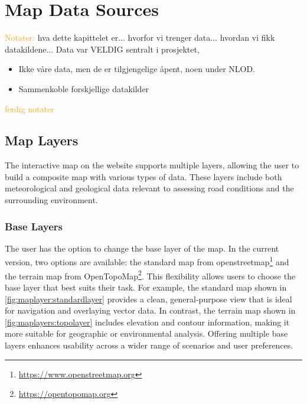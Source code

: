 \chapter{Map Data Sources}\label{chap:mapdatasources}

\textcolor{orange}{Notater:}
hva dette kapittelet er... hvorfor vi trenger data... hvordan vi fikk datakildene... 
Data var VELDIG sentralt i prosjektet, 
\begin{itemize}
    \item Ikke våre data, men de er tilgjengelige åpent, noen under NLOD.
    \item Sammenkoble forskjellige datakilder
\end{itemize}
\textcolor{orange}{ferdig notater}

\section{Map Layers}\label{sec:maplayers}

The interactive map on the website supports multiple layers, allowing the user to build a composite map with various types of data. These layers include both meteorological and geological data relevant to assessing road conditions and the surrounding environment.

\subsection{Base Layers}\label{subsec:baselayers}

The user has the option to change the base layer of the map. In the current version, two options are available: the standard map from \gls{openstreetmap}\footnote{\url{https://www.openstreetmap.org}} and the terrain map from OpenTopoMap\footnote{\url{https://opentopomap.org}}. This flexibility allows users to choose the base layer that best suits their task. For example, the standard map shown in \autoref{fig:maplayer:standardlayer} provides a clean, general-purpose view that is ideal for navigation and overlaying vector data. In contrast, the terrain map shown in \autoref{fig:maplayers:topolayer} includes elevation and contour information, making it more suitable for geographic or environmental analysis. Offering multiple base layers enhances usability across a wider range of scenarios and user preferences.

